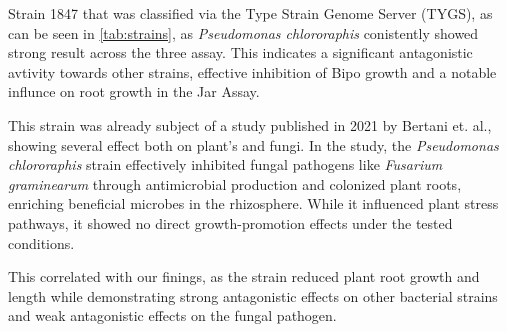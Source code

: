 Strain 1847 that was classified via the Type Strain Genome Server (TYGS), as can be seen in \autoref{tab:strains}, as \textit{Pseudomonas chlororaphis} conistently showed strong result across the three assay. This indicates a significant antagonistic avtivity towards other strains, effective inhibition of \ac{Bipo} growth and a notable influnce on root growth in the Jar Assay.

This strain was already subject of a study published in 2021 by Bertani et. al., showing several effect both on plant's and fungi. 
In the study, the \textit{Pseudomonas chlororaphis} strain effectively inhibited fungal pathogens like \textit{Fusarium graminearum} through antimicrobial production and colonized plant roots, enriching beneficial microbes in the rhizosphere. While it influenced plant stress pathways, it showed no direct growth-promotion effects under the tested conditions. \cite{bertani2021Isolation}

This correlated with our finings, as the strain reduced plant root growth and length while demonstrating  strong antagonistic effects on other bacterial strains and weak antagonistic effects on the fungal pathogen.